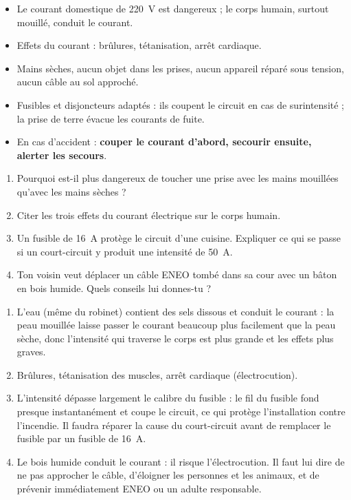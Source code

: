 \documentclass[11pt]{article}
\begin{document}
\begin{aretenir}
\begin{itemize}
\item Le courant domestique de \SI{220}{V} est dangereux ; le corps humain, surtout mouillé, conduit le courant.
\item Effets du courant : brûlures, tétanisation, arrêt cardiaque.
\item Mains sèches, aucun objet dans les prises, aucun appareil réparé sous tension, aucun câble au sol approché.
\item Fusibles et disjoncteurs adaptés : ils coupent le circuit en cas de surintensité ; la prise de terre évacue les courants de fuite.
\item En cas d'accident : \textbf{couper le courant d'abord, secourir ensuite, alerter les secours}.
\end{itemize}
\end{aretenir}

\begin{exercice}
\begin{enumerate}
\item Pourquoi est-il plus dangereux de toucher une prise avec les mains mouillées qu'avec les mains sèches ?
\item Citer les trois effets du courant électrique sur le corps humain.
\item Un fusible de \SI{16}{A} protège le circuit d'une cuisine. Expliquer ce qui se passe si un court-circuit y produit une intensité de \SI{50}{A}.
\item Ton voisin veut déplacer un câble ENEO tombé dans sa cour avec un bâton en bois humide. Quels conseils lui donnes-tu ?
\end{enumerate}
\end{exercice}

\begin{corrige}
\begin{enumerate}
\item L'eau (même du robinet) contient des sels dissous et conduit le courant : la peau mouillée laisse passer le courant beaucoup plus facilement que la peau sèche, donc l'intensité qui traverse le corps est plus grande et les effets plus graves.
\item Brûlures, tétanisation des muscles, arrêt cardiaque (électrocution).
\item L'intensité dépasse largement le calibre du fusible : le fil du fusible fond presque instantanément et coupe le circuit, ce qui protège l'installation contre l'incendie. Il faudra réparer la cause du court-circuit avant de remplacer le fusible par un fusible de \SI{16}{A}.
\item Le bois humide conduit le courant : il risque l'électrocution. Il faut lui dire de ne pas approcher le câble, d'éloigner les personnes et les animaux, et de prévenir immédiatement ENEO ou un adulte responsable.
\end{enumerate}
\end{corrige}
\end{document}
